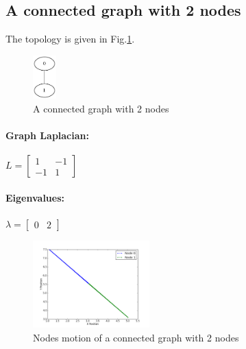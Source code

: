 \documentclass[12pt]{article}
\begin{document}
\subsection{A connected graph with 2 nodes}

The topology is given in Fig.\ref{fig:C1}. 
\begin{figure}[htbp]
\centering
\includegraphics[width=0.08\textwidth]{./C1}
\caption{A connected graph with 2 nodes}
\label{fig:C1}
\end{figure}


\paragraph{\textbf{Graph Laplacian:}}

$
L = 
\begin{bmatrix}
1 & -1 \\
-1 & 1
\end{bmatrix}
$

\paragraph{\textbf{Eigenvalues:}}

$
\lambda = 
\begin{bmatrix}
0 & 2 
\end{bmatrix}
$

\begin{figure}[htbp]
\centering
\includegraphics[width=0.4\textwidth]{./C1_mo}
\caption{Nodes motion of a connected graph with 2 nodes}
\label{fig:C1_mo}
\end{figure}
\end{document}
